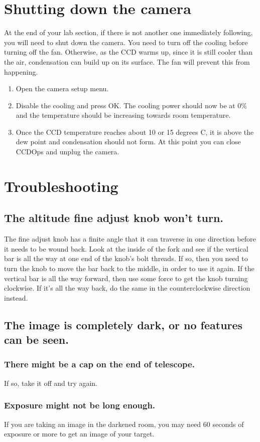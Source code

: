 \documentclass{article}
\begin{document}
\section{Shutting down the camera}

At the end of your lab section, if there is not another one immediately following, you will need to shut down the camera. You need to turn off the cooling before turning off the fan. Otherwise, as the CCD warms up, since it is still cooler than the air, condensation can build up on its surface. The fan will prevent this from happening.

\begin{enumerate}
	\item Open the camera setup menu.
	
	\item Disable the cooling and press OK. The cooling power should now be at 0\% and the temperature should be increasing towards room temperature.
	
	\item Once the CCD temperature reaches about 10 or 15 degrees C, it is above the dew point and condensation should not form. At this point you can close CCDOps and unplug the camera.
\end{enumerate}

\section{Troubleshooting}

\subsection{The altitude fine adjust knob won't turn.}

The fine adjust knob has a finite angle that it can traverse in one direction before it needs to be wound back. Look at the inside of the fork and see if the vertical bar is all the way at one end of the knob's bolt threads. If so, then you need to turn the knob to move the bar back to the middle, in order to use it again. If the vertical bar is all the way forward, then use some force to get the knob turning clockwise. If it's all the way back, do the same in the counterclockwise direction instead.

\subsection{The image is completely dark, or no features can be seen.}

\subsubsection{There might be a cap on the end of telescope.}

If so, take it off and try again.

\subsubsection{Exposure might not be long enough.}

If you are taking an image in the darkened room, you may need 60 seconds of exposure or more to get an image of your target.
\end{document}
